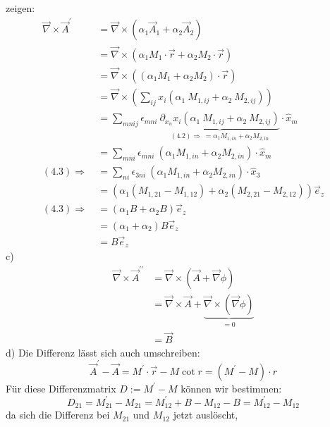 \documentclass[11pt a4paper]{article}
\begin{document}
zeigen:
\begin{align*}
	\vec \nabla \times \vec A^\prime
	&= \vec \nabla \times \left(
		\alpha_1 \vec A_1 + \alpha_2 \vec A_2
	\right) \\
	&= \vec \nabla \times \left(
		\alpha_1 M_1 \cdot \vec r + \alpha_2 M_2 \cdot \vec r
	\right) \\
	&= \vec \nabla \times \left(
		(\alpha_1 M_1 + \alpha_2 M_2) \cdot \vec r
	\right) \\
	&= \vec \nabla \times \left(
		\sum_{i j} x_i (\alpha_1 \ M_{1, ij} + 
		\alpha_2 \ M_{2, ij})
	\right) \\ 
	&= \sum_{m n i j} \epsilon_{mni} \  \underbrace{\partial_{x_n} x_i 
	(\alpha_1 \ M_{1, ij} + \alpha_2 \ M_{2, ij})}_{
		(4.2) \Rightarrow \ =\alpha_1 M_{1, in} 
		+ \alpha_2 M_{2, in}}
	\cdot \hat x_m \\[0.1cm]
	&= \sum_{m n i} \epsilon_{mni} \
		\left( \alpha_1 M_{1, in} + \alpha_2 M_{2, in} \right)
	\cdot \hat x_m \\
	(4.3) \Rightarrow \ 
	&= \sum_{n i} \epsilon_{3ni} \
		\left( \alpha_1 M_{1, in} + \alpha_2 M_{2, in} \right)
	\cdot \hat x_3 \\
	&= \left( \alpha_1 (M_{1,21} - M_{1,12}) + \alpha_2
		(M_{2,21} - M_{2,12}) \right) \vec e_z \\
	(4.3) \Rightarrow \ 
	&= \left( \alpha_1 B + \alpha_2 B \right) \vec e_z \\
	&= \left( \alpha_1 + \alpha_2 \right) B \vec e_z \\
	&= B \vec e_z
\end{align*}
\newpage
c)
\begin{align*}
	\vec\nabla \times \vec A^{\prime\prime} 
	&= \vec\nabla \times (\vec A + \vec\nabla \phi) \\
	&= \vec\nabla \times \vec A + 
	\underbrace{\vec\nabla \times (\vec\nabla \phi)}_{=0} \\
	&= \vec B
\end{align*}
\vspace{0.5cm}
d)
Die Differenz lässt sich auch umschreiben:
\[
	\vec A^\prime - \vec A 
	= M^\prime \cdot \vec r - M \cot r
	= (M^\prime - M) \cdot r
\]
Für diese Differenzmatrix $D := M^\prime - M$ können wir bestimmen:
\[
	D_{21} = M_{21}^\prime - M_{21} 
	= M_{12}^\prime + B - M_{12} - B = M_{12}^\prime - M_{12}
\]
da sich die Differenz bei $M_{21}$ und $M_{12}$ jetzt auslöscht, 
\end{document}

